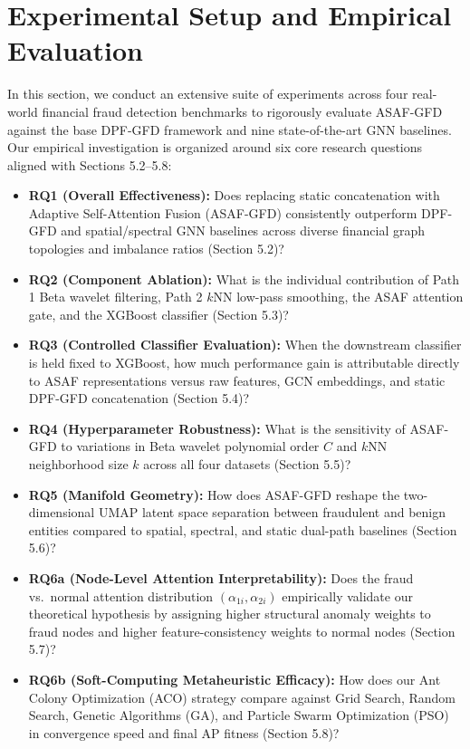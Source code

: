 \documentclass[10pt,a4paper,twocolumn]{article}
\begin{document}
\section{Experimental Setup and Empirical Evaluation}

In this section, we conduct an extensive suite of experiments across four real-world financial fraud detection benchmarks to rigorously evaluate ASAF-GFD against the base DPF-GFD framework \cite{ref9} and nine state-of-the-art GNN baselines. Our empirical investigation is organized around six core research questions aligned with Sections 5.2--5.8:

\begin{itemize}
  \item \textbf{RQ1 (Overall Effectiveness):} Does replacing static concatenation with Adaptive Self-Attention Fusion (ASAF-GFD) consistently outperform DPF-GFD and spatial/spectral GNN baselines across diverse financial graph topologies and imbalance ratios (Section 5.2)?
  \item \textbf{RQ2 (Component Ablation):} What is the individual contribution of Path 1 Beta wavelet filtering, Path 2 $k$NN low-pass smoothing, the ASAF attention gate, and the XGBoost classifier (Section 5.3)?
  \item \textbf{RQ3 (Controlled Classifier Evaluation):} When the downstream classifier is held fixed to XGBoost, how much performance gain is attributable directly to ASAF representations versus raw features, GCN embeddings, and static DPF-GFD concatenation (Section 5.4)?
  \item \textbf{RQ4 (Hyperparameter Robustness):} What is the sensitivity of ASAF-GFD to variations in Beta wavelet polynomial order $C$ and $k$NN neighborhood size $k$ across all four datasets (Section 5.5)?
  \item \textbf{RQ5 (Manifold Geometry):} How does ASAF-GFD reshape the two-dimensional UMAP latent space separation between fraudulent and benign entities compared to spatial, spectral, and static dual-path baselines (Section 5.6)?
  \item \textbf{RQ6a (Node-Level Attention Interpretability):} Does the fraud vs.\ normal attention distribution $(\alpha_{1i}, \alpha_{2i})$ empirically validate our theoretical hypothesis by assigning higher structural anomaly weights to fraud nodes and higher feature-consistency weights to normal nodes (Section 5.7)?
  \item \textbf{RQ6b (Soft-Computing Metaheuristic Efficacy):} How does our Ant Colony Optimization (ACO) strategy compare against Grid Search, Random Search, Genetic Algorithms (GA), and Particle Swarm Optimization (PSO) in convergence speed and final AP fitness (Section 5.8)?
\end{itemize}
\end{document}
